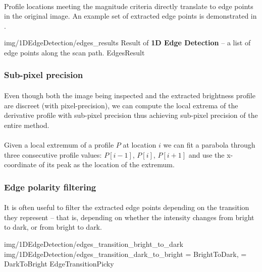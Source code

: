 \paragraph*{}
Profile locations meeting the magnitude criteria directly translate to edge points in the original image. An example set of extracted edge points is demonstrated in .

\oneFigure
{img/1DEdgeDetection/edges_results}
{Result of \textbf{1D Edge Detection} -- a list of edge points along the scan path.}
{EdgesResult}
{\basicWidth}

\subsubsection{Sub-pixel precision}

\paragraph*{}
Even though both the image being inspected and the extracted brightness profile are discreet (with pixel-precision), we can compute the local extrema of the derivative profile with sub-pixel precision thus achieving sub-pixel precision of the entire method.

\paragraph*{}
Given a local extremum of a profile $P$ at location $i$ we can fit a parabola through three consecutive profile values: $P[i-1]$, $P[i]$, $P[i+1]$ and use the x-coordinate of its peak as the location of the extremum.

\subsubsection{Edge polarity filtering}
\paragraph*{}
It is often useful to filter the extracted edge points depending on the transition they represent -- that is, depending on whether the intensity changes from bright to dark, or from bright to dark.

\twoFigures
{img/1DEdgeDetection/edges_transition_bright_to_dark}
{img/1DEdgeDetection/edges_transition_dark_to_bright}
{ = BrightToDark,  = DarkToBright}
{EdgeTransitionPicky}
{\basicWidth}

